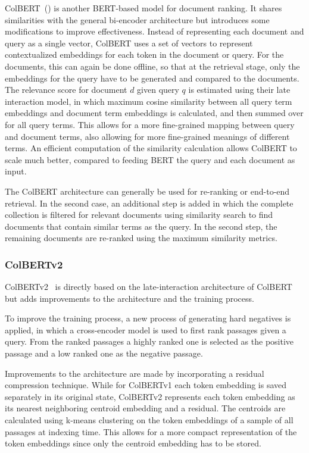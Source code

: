 ColBERT~(\cite{khattab:2020:Colbert}) is another BERT-based model for document ranking.
It shares similarities with the general bi-encoder architecture but introduces some modifications to improve effectiveness.
Instead of representing each document and query as a single vector, ColBERT uses a set of vectors to represent contextualized embeddings for each token in the document or query.
For the documents, this can again be done offline, so that at the retrieval stage, only the embeddings for the query have to be generated and compared to the documents.
The relevance score for document $d$ given query $q$ is estimated using their late interaction model, in which maximum cosine similarity between all query term embeddings and document term embeddings is calculated, and then summed over for all query terms.
This allows for a more fine-grained mapping between query and document terms, also allowing for more fine-grained meanings of different terms.
An efficient computation of the similarity calculation allows ColBERT to scale much better, compared to feeding BERT the query and each document as input.

The ColBERT architecture can generally be used for re-ranking or end-to-end retrieval.
In the second case, an additional step is added in which the complete collection is filtered for relevant documents using similarity search to find documents that contain similar terms as the query.
In the second step, the remaining documents are re-ranked using the maximum similarity metrics.

\subsubsection{ColBERTv2}\label{sec:colbertv2}
ColBERTv2~\citep{santhanam:2021:Colbertv2} is directly based on the late-interaction architecture of ColBERT but adds improvements to the architecture and the training process.

To improve the training process, a new process of generating hard negatives is applied, in which a cross-encoder model is used to first rank passages given a query.
From the ranked passages a highly ranked one is selected as the positive passage and a low ranked one as the negative passage.

Improvements to the architecture are made by incorporating a residual compression technique.
While for ColBERTv1 each token embedding is saved separately in its original state, ColBERTv2 represents each token embedding as its nearest neighboring centroid embedding and a residual.
The centroids are calculated using k-means clustering on the token embeddings of a sample of all passages at indexing time. 
This allows for a more compact representation of the token embeddings since only the centroid embedding has to be stored.

